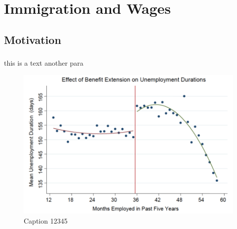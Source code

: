 \chapter{Immigration and Wages}


\section{Motivation}

    \subsection{}

        \subsubsection{}

            this is a text
            another para

            \begin{figure}[H]
                \centering
                \includegraphics[width=4.5in]{images/ch1/card_2.png}
                \caption{Caption 12345}
                \label{fig:figure}
            \end{figure}

            
            